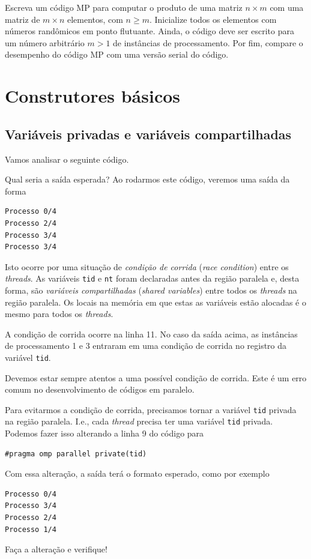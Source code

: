 \begin{exer}\label{exer:cc_exer_AB}
  Escreva um código MP para computar o produto de uma matriz $n\times m$ com uma matriz de $m\times n$ elementos, com $n \geq m$. Inicialize todos os elementos com números randômicos em ponto flutuante. Ainda, o código deve ser escrito para um número arbitrário $m>1$ de instâncias de processamento. Por fim, compare o desempenho do código MP com uma versão serial do código.
\end{exer}

\section{Construtores básicos}\label{cap_mp_sec_cb}

\subsection{Variáveis privadas e variáveis compartilhadas}

Vamos analisar o seguinte código.



Qual seria a saída esperada? Ao rodarmos este código, veremos uma saída da forma
\begin{verbatim}
Processo 0/4
Processo 2/4
Processo 3/4
Processo 3/4
\end{verbatim}
Isto ocorre por uma situação de \emph{condição de corrida} (\emph{race condition}) entre os {\it threads}. As variáveis \verb+tid+ e \verb+nt+ foram declaradas antes da região paralela e, desta forma, são \emph{variáveis compartilhadas} (\emph{shared variables}) entre todos os {\it threads} na região paralela. Os locais na memória em que estas as variáveis estão alocadas é o mesmo para todos os {\it threads}.

A condição de corrida ocorre na linha 11. No caso da saída acima, as instâncias de processamento 1 e 3 entraram em uma condição de corrida no registro da variável \verb+tid+.

\begin{obs}
  Devemos estar sempre atentos a uma possível condição de corrida. Este é um erro comum no desenvolvimento de códigos em paralelo.
\end{obs}

Para evitarmos a condição de corrida, precisamos tornar a variável \verb+tid+ privada na região paralela. I.e., cada {\it thread} precisa ter uma variável \verb+tid+ privada. Podemos fazer isso alterando a linha 9 do código para
\begin{verbatim}
#pragma omp parallel private(tid)
\end{verbatim}
Com essa alteração, a saída terá o formato esperado, como por exemplo
\begin{verbatim}
Processo 0/4
Processo 3/4
Processo 2/4
Processo 1/4
\end{verbatim}
Faça a alteração e verifique!

